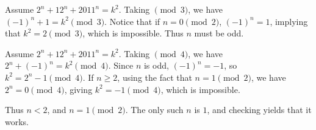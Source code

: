 Assume $2^n+12^n+2011^n=k^2$. Taking $\pmod{3}$, we have $(-1)^n+1=k^2\pmod{3}$. Notice that if $n=0\pmod{2}$, $(-1)^n=1$, implying that $k^2=2\pmod{3}$, which is impossible. Thus $n$ must be odd.

Assume $2^n+12^n+2011^n=k^2$. Taking $\pmod{4}$, we have $2^n+(-1)^n=k^2\pmod{4}$. Since $n$ is odd, $(-1)^n=-1$, so $k^2=2^n-1\pmod{4}$. If $n\ge 2$, using the fact that $n=1\pmod{2}$, we have $2^n=0\pmod{4}$, giving $k^2=-1\pmod{4}$, which is impossible.

Thus $n<2$, and $n=1\pmod{2}$. The only such $n$ is $\boxed{1}$, and checking yields that it works.
